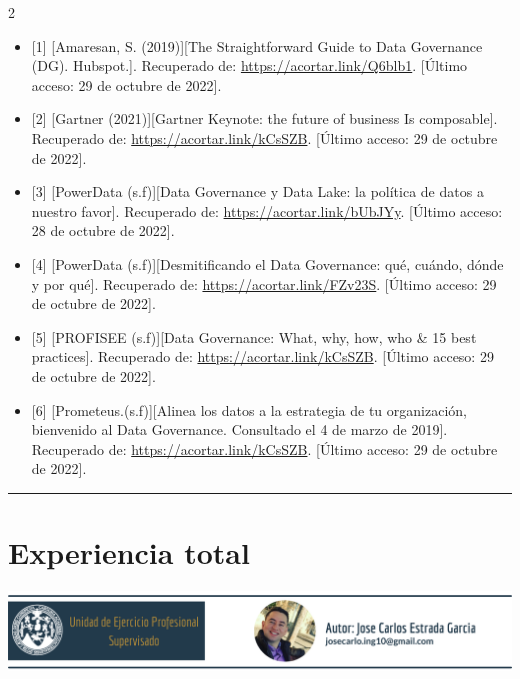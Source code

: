 \documentclass[12pt,spanish,Letterpaper,openany]{book}
\newcommand{\HRule}{\begin{center}\rule{0.5\linewidth}{0.2mm}\end{center}}
\begin{document}
\begin {multicols}{2}
\begin{itemize}
\item
  {[}1{]} {[}Amaresan, S. (2019){]}{[}The Straightforward Guide to Data Governance (DG). Hubspot.{]}. Recuperado de: \url{https://acortar.link/Q6blb1}. {[}Último acceso: 29 de octubre de 2022{]}.
\item
  {[}2{]} {[}Gartner (2021){]}{[}Gartner Keynote: the future of business Is composable{]}. Recuperado de: \url{https://acortar.link/kCsSZB}. {[}Último acceso: 29 de octubre de 2022{]}.
\item
  {[}3{]} {[}PowerData (s.f){]}{[}Data Governance y Data Lake: la política de datos a nuestro favor{]}. Recuperado de: \url{https://acortar.link/bUbJYy}. {[}Último acceso: 28 de octubre de 2022{]}.
\item
  {[}4{]} {[}PowerData (s.f){]}{[}Desmitificando el Data Governance: qué, cuándo, dónde y por qué{]}. Recuperado de: \url{https://acortar.link/FZv23S}. {[}Último acceso: 29 de octubre de 2022{]}.
\item
  {[}5{]} {[}PROFISEE (s.f){]}{[}Data Governance: What, why, how, who \& 15 best practices{]}. Recuperado de: \url{https://acortar.link/kCsSZB}. {[}Último acceso: 29 de octubre de 2022{]}.
\item
  {[}6{]} {[}Prometeus.(s.f){]}{[}Alinea los datos a la estrategia de tu organización, bienvenido al Data Governance. Consultado el 4 de marzo de 2019{]}. Recuperado de: \url{https://acortar.link/kCsSZB}. {[}Último acceso: 29 de octubre de 2022{]}.
\end{itemize}

\end {multicols}
\medskip
\HRule
\medskip

\hypertarget{Estrada}{%
\chapter{Experiencia total}\label{Estrada}}

\begin{center}\includegraphics[width=1\linewidth]{images/jEstrada_image1} \end{center}
\end{document}
